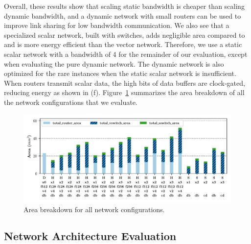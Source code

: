 Overall, these results show that scaling static bandwidth is cheaper than scaling dynamic bandwidth, and a dynamic network with small routers can be used to improve link sharing for low bandwidth communication.  
We also see that a specialized scalar network, built with switches, adds negligible area compared to and is more energy efficient than the vector network. 
Therefore, we use a static scalar network with a bandwidth of 4 for the remainder of our evaluation, except when evaluating the pure dynamic network.
The dynamic network is also optimized for the rare instances when the static scalar network is insufficient. 
When routers transmit scalar data, the high bits of data buffers are clock-gated, reducing energy as shown in (f).
Figure~\ref{fig:area} summarizes the area breakdown of all the network configurations that we evaluate.

\begin{figure}
\centering
\includegraphics[width=1\columnwidth]{figs/area.pdf}
  \caption{Area breakdown for all network configurations.}\label{fig:area}
\end{figure}

\subsection{Network Architecture Evaluation} \label{sec:net_dse}

